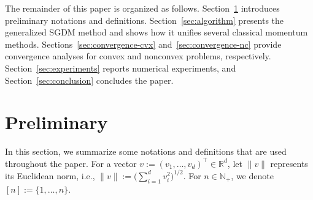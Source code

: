 \documentclass[10pt]{article}
\numberwithin{equation}{section}
\theoremstyle{definition}
\newcommand{\rbb}{\mathbb{R}}  %
\begin{document}
The remainder of this paper is organized as follows. Section~\ref{sec:preliminary} introduces preliminary notations and definitions. Section~\ref{sec:algorithm} presents the generalized SGDM method and shows how it unifies several classical momentum methods. Sections~\ref{sec:convergence-cvx} and~\ref{sec:convergence-nc} provide convergence analyses for convex and nonconvex problems, respectively. Section~\ref{sec:experiments} reports numerical experiments, and Section~\ref{sec:conclusion} concludes the paper.

\section{Preliminary}
\label{sec:preliminary}
In this section, we summarize some notations and definitions that are used throughout the paper.
For a vector $v:=(v_1,\dots, v_d)^\top\in \rbb^d$, let $\|v\|$ represents its Euclidean norm, i.e., $\|v\|:=\big(\sum_{i=1}^d v_i^2\big)^{1/2}$. For $n\in\mathbb{N}_+$, we denote $[n]:=\{1,\ldots,n\}$. 
\end{document}

